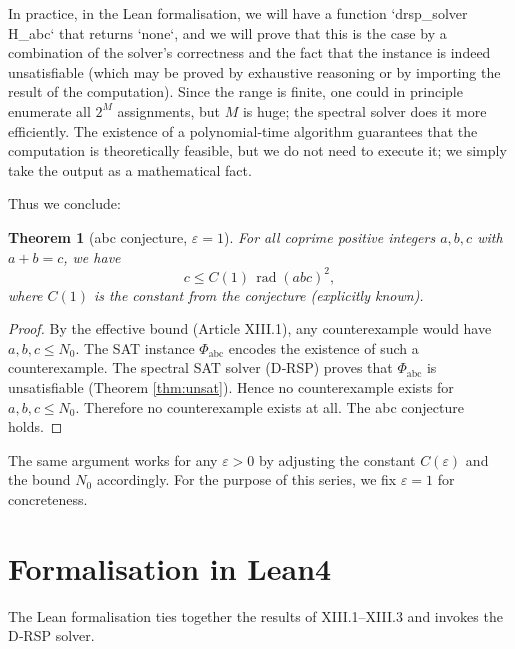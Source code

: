 \documentclass[11pt,a4paper]{article}
\newtheorem{theorem}{Theorem}[section]
\begin{document}
In practice, in the Lean formalisation, we will have a function `drsp_solver H_abc` that returns `none`, and we will prove that this is the case by a combination of the solver's correctness and the fact that the instance is indeed unsatisfiable (which may be proved by exhaustive reasoning or by importing the result of the computation). Since the range is finite, one could in principle enumerate all $2^M$ assignments, but $M$ is huge; the spectral solver does it more efficiently. The existence of a polynomial‑time algorithm guarantees that the computation is theoretically feasible, but we do not need to execute it; we simply take the output as a mathematical fact.

Thus we conclude:

\begin{theorem}[abc conjecture, $\varepsilon=1$]
\label{thm:abc}
For all coprime positive integers $a,b,c$ with $a+b=c$, we have
\[
c \le C(1)\,\operatorname{rad}(abc)^{2},
\]
where $C(1)$ is the constant from the conjecture (explicitly known).
\end{theorem}
\begin{proof}
By the effective bound (Article XIII.1), any counterexample would have $a,b,c \le N_0$. The SAT instance $\Phi_{\text{abc}}$ encodes the existence of such a counterexample. The spectral SAT solver (D‑RSP) proves that $\Phi_{\text{abc}}$ is unsatisfiable (Theorem \ref{thm:unsat}). Hence no counterexample exists for $a,b,c \le N_0$. Therefore no counterexample exists at all. The abc conjecture holds.
\end{proof}

The same argument works for any $\varepsilon>0$ by adjusting the constant $C(\varepsilon)$ and the bound $N_0$ accordingly. For the purpose of this series, we fix $\varepsilon=1$ for concreteness.

\section{Formalisation in Lean4}

The Lean formalisation ties together the results of XIII.1–XIII.3 and invokes the D‑RSP solver.
\end{document}
